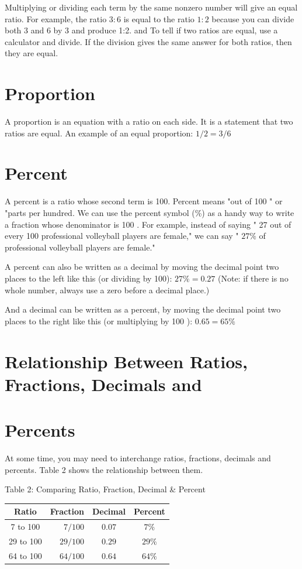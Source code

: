 \documentclass[10pt]{article}
\begin{document}
Multiplying or dividing each term by the same nonzero number will give an equal ratio. For example, the ratio $3: 6$ is equal to the ratio $1: 2$ because you can divide both 3 and 6 by 3 and produce 1:2. and To tell if two ratios are equal, use a calculator and divide. If the division gives the same answer for both ratios, then they are equal.

\section{Proportion}
A proportion is an equation with a ratio on each side. It is a statement that two ratios are equal. An example of an equal proportion: $1 / 2=3 / 6$

\section{Percent}
A percent is a ratio whose second term is 100. Percent means "out of 100 " or "parts per hundred. We can use the percent symbol (\%) as a handy way to write a fraction whose denominator is 100 . For example, instead of saying " 27 out of every 100 professional volleyball players are female," we can say " $27 \%$ of professional volleyball players are female."

A percent can also be written as a decimal by moving the decimal point two places to the left like this (or dividing by 100): $27 \%=0.27$ (Note: if there is no whole number, always use a zero before a decimal place.)

And a decimal can be written as a percent, by moving the decimal point two places to the right like this (or multiplying by 100 ): $0.65=65 \%$

\section{Relationship Between Ratios, Fractions, Decimals and}
\section{Percents}
At some time, you may need to interchange ratios, fractions, decimals and percents. Table 2 shows the relationship between them.

Table 2: Comparing Ratio, Fraction, Decimal \& Percent

\begin{tabular}{|c|r|c|c|}
\hline
Ratio & Fraction & Decimal & Percent \\
\hline
7 to 100 & $7 / 100$ & $0.07$ & $7 \%$ \\
\hline
29 to 100 & $29 / 100$ & $0.29$ & $29 \%$ \\
\hline
64 to 100 & $64 / 100$ & $0.64$ & $64 \%$ \\
\hline
\end{tabular}
\end{document}
